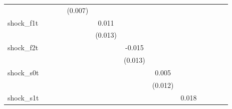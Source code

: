 {\begin{tabular}{l*{12}{c}}
            &                     &                     &                     &     (0.007)         &                     &                     &                     &                     &                     &                     &                     &                     \\
\addlinespace
shock\_f1t   &                     &                     &                     &                     &       0.011         &                     &                     &                     &                     &                     &                     &                     \\
            &                     &                     &                     &                     &     (0.013)         &                     &                     &                     &                     &                     &                     &                     \\
\addlinespace
shock\_f2t   &                     &                     &                     &                     &                     &      -0.015         &                     &                     &                     &                     &                     &                     \\
            &                     &                     &                     &                     &                     &     (0.013)         &                     &                     &                     &                     &                     &                     \\
\addlinespace
shock\_s0t   &                     &                     &                     &                     &                     &                     &       0.005         &                     &                     &                     &                     &                     \\
            &                     &                     &                     &                     &                     &                     &     (0.012)         &                     &                     &                     &                     &                     \\
\addlinespace
shock\_s1t   &                     &                     &                     &                     &                     &                     &                     &       0.018\sym{*}  &                     &                     &                     &                     \\

\end{tabular}}
